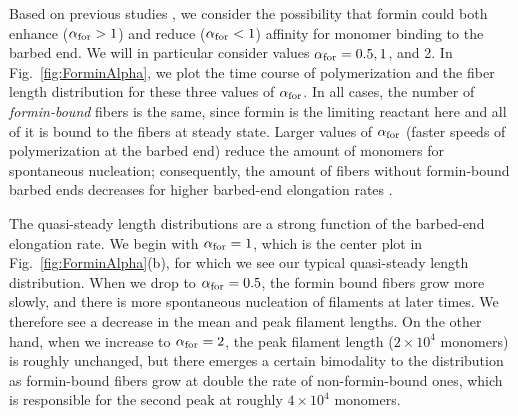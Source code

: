 \documentclass[11pt]{article}
\begin{document}
Based on previous studies \cite{zweifel2021nucleation, funk2019profilin}, we consider the possibility that formin could both enhance ($\alpha_\text{for} > 1$) and reduce ($\alpha_\text{for} < 1$) affinity for monomer binding to the barbed end. We will in particular consider values $\alpha_\text{for}=0.5, 1$, and 2. In Fig.\ \ref{fig:ForminAlpha}, we plot the time course of polymerization and the fiber length distribution for these three values of $\alpha_\text{for}$. In all cases, the number of \emph{formin-bound} fibers is the same, since formin is the limiting reactant here and all of it is bound to the fibers at steady state. Larger values of $\alpha_\text{for}$ (faster speeds of polymerization at the barbed end) reduce the amount of monomers for spontaneous nucleation; consequently, the amount of fibers without formin-bound barbed ends decreases for higher barbed-end elongation rates \cite{banerjee2022emergence}.

The quasi-steady length distributions are a strong function of the barbed-end elongation rate. We begin with $\alpha_\text{for}=1$, which is the center plot in Fig.\ \ref{fig:ForminAlpha}(b), for which we see our typical quasi-steady length distribution. When we drop to $\alpha_\text{for}=0.5$, the formin bound fibers grow more slowly, and there is more spontaneous nucleation of filaments at later times. We therefore see a decrease in the mean and peak filament lengths. On the other hand, when we increase to $\alpha_\text{for}=2$, the peak filament length ($2 \times 10^4$ monomers) is roughly unchanged, but there emerges a certain bimodality to the distribution as formin-bound fibers grow at double the rate of non-formin-bound ones, which is responsible for the second peak at roughly $4 \times 10^4$ monomers.
\end{document}
